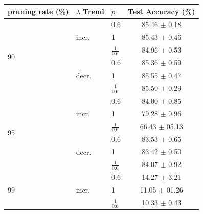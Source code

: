 \begin{table}[htbp]
    \centering
    \begin{tabular}{lllc}
        \toprule
        \textbf{pruning rate} (\%) & \textbf{$\lambda$ Trend} & $p$             & \textbf{Test Accuracy} (\%) \\
        \midrule
        \multirow{6}{*}{90}        & \multirow{3}{*}{incr.}   & 0.6             & 85.46 $\pm$ 0.18            \\
                                   &                          & 1               & 85.43 $\pm$ 0.46            \\
                                   &                          & $\frac{1}{0.6}$ & 84.96 $\pm$ 0.53            \\
        \cline{2-4}
                                   & \multirow{3}{*}{decr.}   & 0.6             & 85.36 $\pm$ 0.59            \\
                                   &                          & 1               & 85.55 $\pm$ 0.47            \\
                                   &                          & $\frac{1}{0.6}$ & 85.50 $\pm$ 0.29            \\
        \midrule
        \multirow{6}{*}{95}        & \multirow{3}{*}{incr.}   & 0.6             & 84.00 $\pm$ 0.85            \\
                                   &                          & 1               & 79.28 $\pm$ 0.96            \\
                                   &                          & $\frac{1}{0.6}$ & 66.43 $\pm$ 05.13           \\
        \cline{2-4}
                                   & \multirow{3}{*}{decr.}   & 0.6             & 83.53 $\pm$ 0.65            \\
                                   &                          & 1               & 83.42 $\pm$ 0.50            \\
                                   &                          & $\frac{1}{0.6}$ & 84.07 $\pm$ 0.92            \\
        \midrule
        \multirow{6}{*}{99}        & \multirow{3}{*}{incr.}   & 0.6             & 14.27 $\pm$ 3.21            \\
                                   &                          & 1               & 11.05 $\pm$ 01.26           \\
                                   &                          & $\frac{1}{0.6}$ & 10.33 $\pm$ 0.43            \\

\end{tabular}
\end{table}

